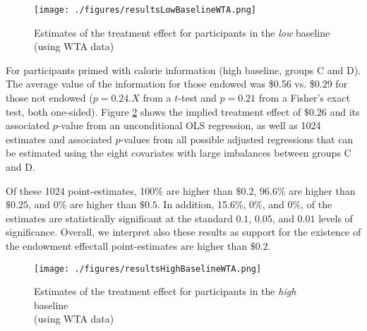 
\begin{figure}[ht]
  \caption{Estimates of the treatment effect for participants in the \emph{low} baseline \\ (using WTA data)}\label{fig:resultsLowBaselineWTA}
  \begin{center}
  {\texttt{[image: ./figures/resultsLowBaselineWTA.png]}}
  \end{center}
\end{figure}

For participants primed with calorie information (high baseline, groups C and D). The average value of the information for those endowed was \$0.56 vs. \$0.29 for those not endowed ($p=0.24.X$ from a $t$-test and $p=0.21$ from a Fisher's exact test, both one-sided). Figure \ref{fig:resultsHighBaselineWTA} shows the implied treatment effect of $\$0.26$ and its associated $p$-value from an unconditional OLS regression, as well as 1024 estimates and associated $p$-values from all possible adjusted regressions that can be estimated using the eight covariates with large imbalances between groups C and D.

Of these 1024 point-estimates, 100\% are higher than $\$0.2$, 96.6\% are higher than $\$0.25$, and 0\% are higher than $\$0.5$. In addition, 15.6\%, 0\%, and 0\%, of the estimates are statistically significant at the standard $0.1$, $0.05$, and $0.01$ levels of significance. Overall, we interpret also these results as support for the existence of the endowment effect\textemdash all point-estimates are higher than $\$0.2$.

\begin{figure}[ht]
  \caption{Estimates of the treatment effect for participants in the \emph{high} baseline \\ (using WTA data)}\label{fig:resultsHighBaselineWTA}
  \begin{center}
  {\texttt{[image: ./figures/resultsHighBaselineWTA.png]}}
  \end{center}
\end{figure}
